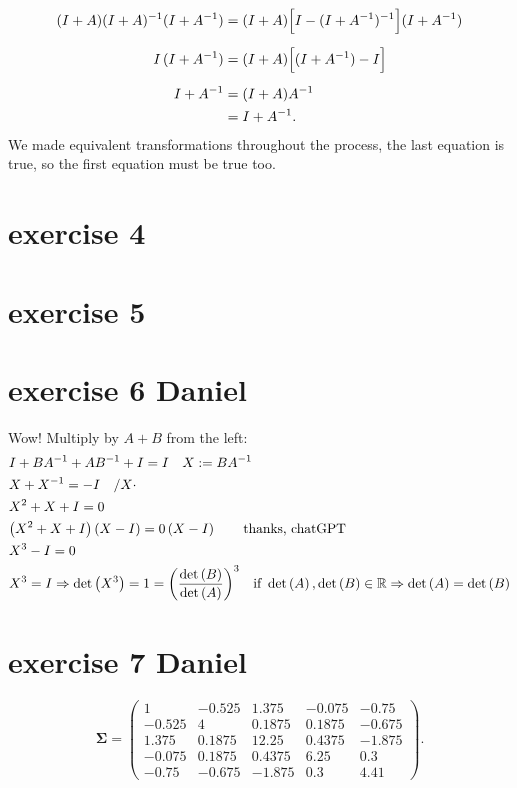 \documentclass{article}
\let\normalSigma\Sigma
\renewcommand{\Sigma}{\bm{\normalSigma}} %
\begin{document}
\begin{align*}
    (I+A)(I+A)^{-1}(I+A^{-1})
     & = (I+A)\Bigl[I-(I+A^{-1})^{-1}\Bigr](I+A^{-1}) \\[2mm]
    I\,(I+A^{-1})
     & = (I+A)\Bigl[(I+A^{-1})-I\Bigr]                \\[2mm]
    I+A^{-1}
     & = (I+A)A^{-1}                                  \\
     & = I+A^{-1}.
\end{align*}
We made equivalent transformations throughout the process, the last equation is true, so the first equation must be true too.
\section{exercise 4}
\section{exercise 5}
\section{exercise 6 Daniel}
Wow! Multiply by $A+B$ from the left:
\[\begin{gathered}
        I + B{A^{ - 1}} + A{B^{ - 1}} + I = I\quad X: = B{A^{ - 1}} \hfill \\
        X + {X^{ - 1}} =  - I\quad /X \cdot  \hfill \\
        {X^2} + X + I = 0 \hfill \\
        \left( {{X^2} + X + I} \right)\left( {X - I} \right) = 0\left( {X - I} \right) \qquad \text{thanks, chatGPT}\hfill \\
        {X^3} - I = 0 \hfill \\
        {X^3} = I \Rightarrow \det \left( {{X^3}} \right) = 1 = {\left( {\frac{{\det \left( B \right)}}{{\det \left( A \right)}}} \right)^3}\quad {\text{if }}\det \left( A \right),\det \left( B \right) \in \mathbb{R} \Rightarrow \det \left( A \right) = \det \left( B \right) \hfill \\
    \end{gathered} \]

\section{exercise 7 Daniel}
\[
    \Sigma =
    \begin{pmatrix}
        1      & -0.525 & 1.375  & -0.075 & -0.75  \\
        -0.525 & 4      & 0.1875 & 0.1875 & -0.675 \\
        1.375  & 0.1875 & 12.25  & 0.4375 & -1.875 \\
        -0.075 & 0.1875 & 0.4375 & 6.25   & 0.3    \\
        -0.75  & -0.675 & -1.875 & 0.3    & 4.41
    \end{pmatrix}.
\]
\end{document}
